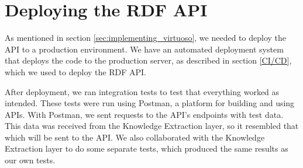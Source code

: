 \section{Deploying the RDF API}
As mentioned in section \ref{sec:implementing_virtuoso}, we needed to deploy the API to a production environment.
We have an automated deployment system that deploys the code to the production server, as described in section \ref{CI/CD}, which we used to deploy the RDF API.

After deployment, we ran integration tests to test that everything worked as intended. These tests were run using Postman, a platform for building and using APIs\cite{PostmanAPIPlatform}. With Postman, we sent requests to the API's endpoints with \knox{} test data. This data was received from the Knowledge Extraction layer, so it resembled that which will be sent to the API.
We also collaborated with the Knowledge Extraction layer to do some separate tests, which produced the same results as our own tests.
